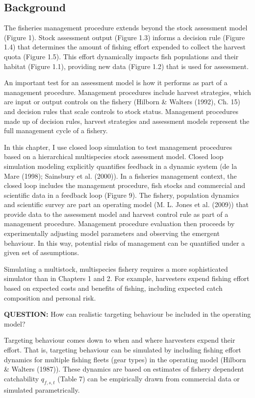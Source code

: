 \documentclass[12pt,]{scrartcl}
\begin{document}
\subsection{Background}\label{background-3}

The fisheries management procedure extends beyond the stock assessment
model (Figure 1). Stock assessment output (Figure 1.3) informs a
decision rule (Figure 1.4) that determines the amount of fishing effort
expended to collect the harvest quota (Figure 1.5). This effort
dynamically impacts fish populations and their habitat (Figure 1.1),
providing new data (Figure 1.2) that is used for assessment.

An important test for an assessment model is how it performs as part of
a management procedure. Management procedures include harvest
strategies, which are input or output controls on the fishery (Hilborn
\& Walters (1992), Ch. 15) and decision rules that scale controls to
stock status. Management procedures made up of decision rules, harvest
strategies and assessment models represent the full management cycle of
a fishery.

In this chapter, I use closed loop simulation to test management
procedures based on a hierarchical multispecies stock assessment model.
Closed loop simulation modeling explicitly quantifies feedback in a
dynamic system (de la Mare (1998); Sainsbury et al. (2000)). In a
fisheries management context, the closed loop includes the management
procedure, fish stocks and commercial and scientific data in a feedback
loop (Figure 9). The fishery, population dynamics and scientific survey
are part an operating model (M. L. Jones et al. (2009)) that provide
data to the assessment model and harvest control rule as part of a
management procedure. Management procedure evaluation then proceeds by
experimentally adjusting model parameters and observing the emergent
behaviour. In this way, potential risks of management can be quantified
under a given set of assumptions.

Simulating a multistock, multispecies fishery requires a more
sophisticated simulator than in Chapters 1 and 2. For example,
harvesters expend fishing effort based on expected costs and benefits of
fishing, including expected catch composition and personal risk.

\textbf{QUESTION:} How can realistic targeting behaviour be included in
the operating model?

Targeting behaviour comes down to when and where harvesters expend their
effort. That is, targeting behaviour can be simulated by including
fishing effort dynamics for multiple fishing fleets (gear types) in the
operating model (Hilborn \& Walters (1987)). These dynamics are based on
estimates of fishery dependent catchability \(q_{f,s,t}\) (Table 7) can
be empirically drawn from commercial data or simulated parametrically.
\end{document}
